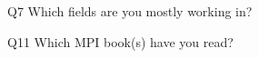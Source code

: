 \begin{description}%
\item{Q7} Which fields are you mostly working in?%
\item{Q11} Which MPI book(s) have you read?%
\end{description}%
